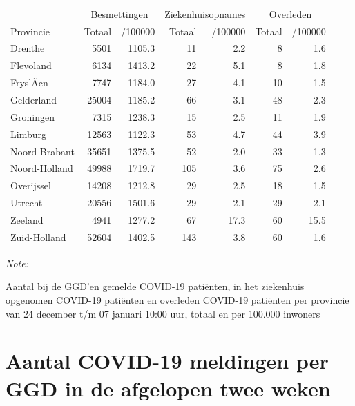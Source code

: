 \documentclass[
  english,
  man,floatsintext]{apa6}
\begin{document}
\begin{table}
\centering
\begin{threeparttable}
\begin{tabular}{lrrrrrr}
\toprule
\multicolumn{1}{c}{ } & \multicolumn{2}{c}{Besmettingen} & \multicolumn{2}{c}{Ziekenhuisopnames} & \multicolumn{2}{c}{Overleden} \\
\cmidrule(l{3pt}r{3pt}){2-3} \cmidrule(l{3pt}r{3pt}){4-5} \cmidrule(l{3pt}r{3pt}){6-7}
Provincie & Totaal & /100000 & Totaal & /100000 & Totaal & /100000\\
\midrule
Drenthe & 5501 & 1105.3 & 11 & 2.2 & 8 & 1.6\\
Flevoland & 6134 & 1413.2 & 22 & 5.1 & 8 & 1.8\\
FryslÃ¢n & 7747 & 1184.0 & 27 & 4.1 & 10 & 1.5\\
Gelderland & 25004 & 1185.2 & 66 & 3.1 & 48 & 2.3\\
Groningen & 7315 & 1238.3 & 15 & 2.5 & 11 & 1.9\\
Limburg & 12563 & 1122.3 & 53 & 4.7 & 44 & 3.9\\
Noord-Brabant & 35651 & 1375.5 & 52 & 2.0 & 33 & 1.3\\
Noord-Holland & 49988 & 1719.7 & 105 & 3.6 & 75 & 2.6\\
Overijssel & 14208 & 1212.8 & 29 & 2.5 & 18 & 1.5\\
Utrecht & 20556 & 1501.6 & 29 & 2.1 & 29 & 2.1\\
Zeeland & 4941 & 1277.2 & 67 & 17.3 & 60 & 15.5\\
Zuid-Holland & 52604 & 1402.5 & 143 & 3.8 & 60 & 1.6\\
\bottomrule
\end{tabular}
\begin{tablenotes}
\item \textit{Note: } 
\item Aantal bij de GGD’en gemelde COVID-19 patiënten, in het ziekenhuis opgenomen COVID-19 patiënten en overleden COVID-19 patiënten per provincie van 24 december t/m 07 januari 10:00 uur, totaal en per 100.000 inwoners
\end{tablenotes}
\end{threeparttable}
\end{table}

\newpage

\hypertarget{aantal-covid-19-meldingen-per-ggd-in-de-afgelopen-twee-weken}{%
\section{Aantal COVID-19 meldingen per GGD in de afgelopen twee weken}\label{aantal-covid-19-meldingen-per-ggd-in-de-afgelopen-twee-weken}}
\end{document}
